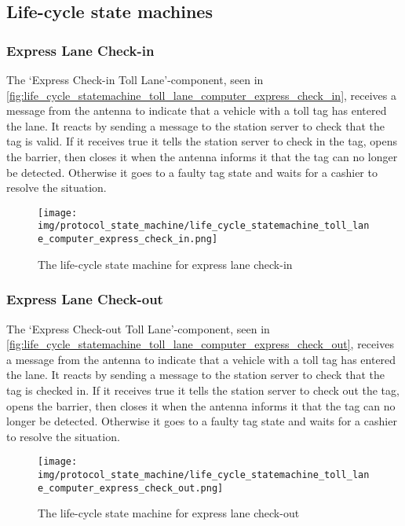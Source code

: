 \subsection*{Life-cycle state machines}
\subsubsection*{Express Lane Check-in}
The ‘Express Check-in Toll Lane’-component, seen in \autoref{fig:life_cycle_statemachine_toll_lane_computer_express_check_in}, receives a message from the antenna to indicate that a vehicle with a toll tag has entered the lane. It reacts by sending a message to the station server to check that the tag is valid. If it receives true it tells the station server to check in the tag, opens the barrier, then closes it when the antenna informs it that the tag can no longer be detected.  Otherwise it goes to a faulty tag state and waits for a cashier to resolve the situation. 
\begin{figure}[H]
\centering
\texttt{[image: img/protocol\_state\_machine/life\_cycle\_statemachine\_toll\_lane\_computer\_express\_check\_in.png]}
\caption{The life-cycle state machine for express lane check-in}
\label{fig:life_cycle_statemachine_toll_lane_computer_express_check_in}
\end{figure}

\subsubsection*{Express Lane Check-out}
The ‘Express Check-out Toll Lane’-component, seen in \autoref{fig:life_cycle_statemachine_toll_lane_computer_express_check_out}, receives a message from the antenna to indicate that a vehicle with a toll tag has entered the lane. It reacts by sending a message to the station server to check that the tag is checked in. If it receives true it tells the station server to check out the tag, opens the barrier, then closes it when the antenna informs it that the tag can no longer be detected.  Otherwise it goes to a faulty tag state and waits for a cashier to resolve the situation. 
\begin{figure}[H]
\centering
\texttt{[image: img/protocol\_state\_machine/life\_cycle\_statemachine\_toll\_lane\_computer\_express\_check\_out.png]}
\caption{The life-cycle state machine for express lane check-out}
\label{fig:life_cycle_statemachine_toll_lane_computer_express_check_out}
\end{figure}

